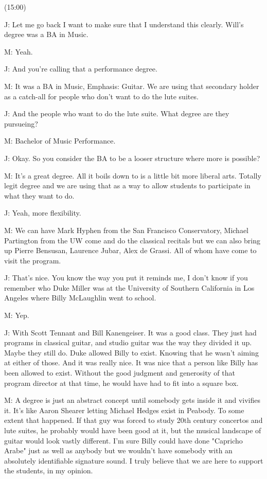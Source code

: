 \documentclass[11pt]{article}
\begin{document}
(15:00)

J: Let me go back I want to make sure that I understand this clearly. Will's degree was a BA in Music. 

M: Yeah.

J: And you're calling that a performance degree.

M: It was a BA in Music, Emphasis: Guitar. We are using that secondary holder as a catch-all for people who don't want to do the lute suites.

J: And the people who want to do the lute suite. What degree are they pursueing?

M: Bachelor of Music Performance.

J: Okay. So you consider the BA to be a looser structure where more is possible? 

M: It's a great degree. All it boils down to is a little bit more liberal arts. Totally legit degree and we are using that as a way to allow students to participate in what they want to do.

J: Yeah, more flexibility. 

M: We can have Mark Hyphen from the San Francisco Conservatory, Michael Partington from the UW come and do the classical recitals but we can also bring up Pierre Bensusan, Laurence Jubar, Alex de Grassi. All of whom have come to visit the program.

J: That's nice. You know the way you put it reminds me, I don't know if you remember who Duke Miller was at the University of Southern California in Los Angeles where Billy McLaughlin went to school.

M: Yep.

J: With Scott Tennant and Bill Kanengeiser. It was a good class. They just had programs in classical guitar, and studio guitar was the way they divided it up. Maybe they still do. Duke allowed Billy to exist. Knowing that he wasn't aiming at either of those. And it was really nice. It was nice that a person like Billy has been allowed to exist. Without the good judgment and generosity of that program director at that time, he would have had to fit into a square box. 

M: A degree is just an abstract concept until somebody gets inside it and vivifies it. It's like Aaron Shearer letting Michael Hedges exist in Peabody. To some extent that happened. If that guy was forced to study 20th century concertos and lute suites, he probably would have been good at it, but the musical landscape of guitar would look vastly different. I'm sure Billy could have done "Capricho Arabe" just as well as anybody but we wouldn't have somebody with an absolutely identifiable signature sound. I truly believe that we are here to support the students, in my opinion. 
\end{document}

